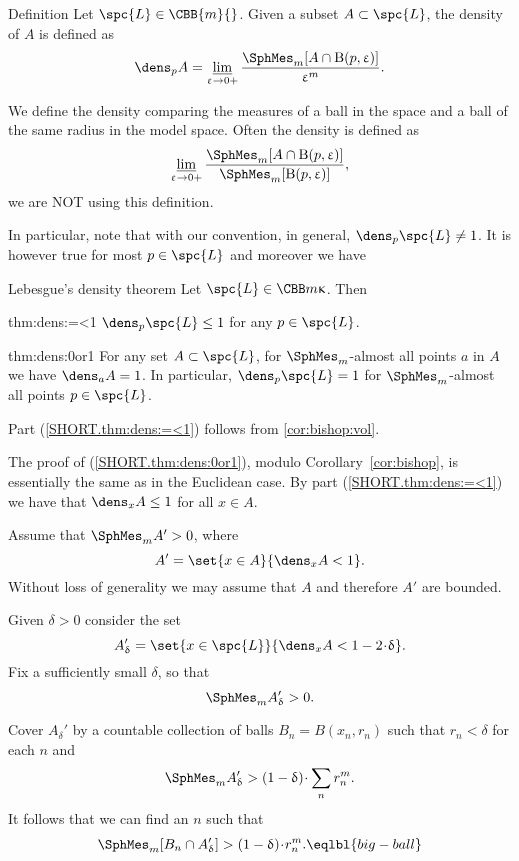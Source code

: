 \begin{thm}{Definition}
Let $\spc{L}\in\CBB{m}{}$.
Given a subset $A\subset\spc{L}$, 
the density of $A$ is defined as
\[\dens_p A
=
\liminf_{\eps\to0+}
\frac{\SphMes_m[A\cap \oBall(p,\eps)]}{\eps^{m}}.\]

\end{thm}

We define the density comparing 
the measures of a ball in the space 
and a ball of the same radius in the model space.
Often the density is defined as 
\[\liminf_{\eps\to0+}\frac{\SphMes_m[A\cap\oBall(p,\eps)]}{\SphMes_m[\oBall(p,\eps)]},\]
we are NOT using this definition.

In particular, note that with our convention, in general, $\dens_p \spc{L}\ne1$. It is however true for most $p\in \spc{L}$ and moreover we have






\begin{thm}{Lebesgue's density theorem}\label{thm:dens}
Let $\spc{L}\in\CBB m\kappa$.
Then 
\begin{subthm}{thm:dens:=<1}
$\dens_p\spc{L}\le 1$ for any $p\in \spc{L}$.
\end{subthm}

\begin{subthm}{thm:dens:0or1}
For any set $A\subset \spc{L}$,
for 
$\SphMes_m$-almost all points $a$ in $A$ 
we have
$\dens_aA=1$. In particular, $\dens_p\spc{L}= 1$ for 
$\SphMes_m$-almost all points $p\in\spc{L}$.
\end{subthm}

\end{thm}

Part (\ref{SHORT.thm:dens:=<1}) follows from \ref{cor:bishop:vol}.

The proof of (\ref{SHORT.thm:dens:0or1}), 
modulo Corollary~\ref{cor:bishop},
is essentially the same as in the Euclidean case. By part  (\ref{SHORT.thm:dens:=<1})  we have that $\dens_xA\le1$ for all $x\in A$.

Assume that $\SphMes_m A'>0$,
where 
\[A'=\set{x\in A}{\dens_xA<1}.\]
Without loss of generality we may assume that $A$ 
and therefore $A'$ are bounded.

Given $\delta>0$ consider the set 
\[A'_\delta=\set{x\in\spc{L}}{\dens_xA<1-2\cdot\delta}.\]
Fix a sufficiently small $\delta$, 
so that 
\[\SphMes_m A'_\delta>0.\]

Cover $A_\delta'$ by a countable collection of balls $B_n=B(x_n,r_n)$
such that $r_n<\delta$ for each $n$ and
\[\SphMes_m  A'_\delta>(1-\delta)\cdot\sum_n r_n^{m}
.\]
It follows that we can find an $n$ such that
\[\SphMes_m [B_n\cap A'_\delta]
>
(1-\delta)\cdot r_n^{m}.\eqlbl{big-ball}\]

